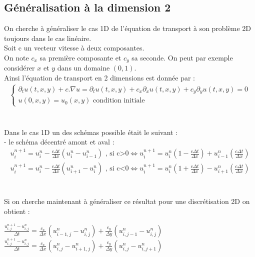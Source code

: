 \documentclass[12pt]{article}
\begin{document}
\subsection{Généralisation à la dimension 2}
\noindent On cherche à généraliser le cas 1D de l'équation de transport à son problème 2D toujours dans le cas linéaire.
\\ Soit c un vecteur vitesse à deux composantes.
\\On note $c_x$ sa première composante et $c_y$ sa seconde.
On peut par exemple considérer $x$ et $y$ dans un domaine $(0,1)$.
\\Ainsi l'équation de transport en 2 dimensions est donnée par :
\\
\begin{eqnarray*}
      \left\{
        \begin{array}{llll}
            \partial_tu(t,x,y)+c.\nabla u=\partial_tu(t,x,y) +c_x\partial_xu(t,x,y)+c_y\partial_yu(t,x,y)=0
            \\ u(0,x,y)=u_0(x,y) \text{ condition initiale}
        \end{array}
    \right .
\end{eqnarray*}
\\
\\Dans le cas 1D un des schémas possible était le suivant :
\\- le schéma décentré amont et aval :
\begin{eqnarray*}
        u^{n+1}_i=u_i^n-\frac{c\Delta t}{\Delta x}({u_{i}^n-u_{i-1}^n}) \text{       , si c>0}
        \iff u^{n+1}_i=u_i^n\left(1-\frac{c\Delta t}{\Delta x}\right)+u_{i-1}^n\left(\frac{c\Delta t}{\Delta x}\right)	
        \\u^{n+1}_i=u_i^n-\frac{c\Delta t}{\Delta x}({u_{i+1}^n-u_{i}^n}) \text{       , si c<0}
        \iff u^{n+1}_i=u_i^n\left(1+\frac{c\Delta t}{\Delta x}\right)-u_{i+1}^n\left(\frac{c\Delta t}{\Delta x}\right)
\end{eqnarray*}
\\
\\Si on cherche maintenant à généraliser ce résultat pour une discrétisation 2D on obtient :
\\
\begin{center}
         $\displaystyle\frac{u_{i,j}^{n+1}-u_{i,j}^{n}}{\Delta t}=\frac{c_x}{\Delta x}(u_{i-1,j}^n-u_{i,j}^n)+\frac{c_y}{\Delta y}(u_{i,j-1}^n-u_{i,j}^n)$
        \\
        $ \displaystyle\frac{u_{i,j}^{n+1}-u_{i,j}^{n}}{\Delta t}=\frac{c_x}{\Delta x}(u_{i,j}^n-u_{i+1,j}^n)+\frac{c_y}{\Delta y}(u_{i,j}^n-u_{i,j+1}^n)$
\end{center}
\end{document}
